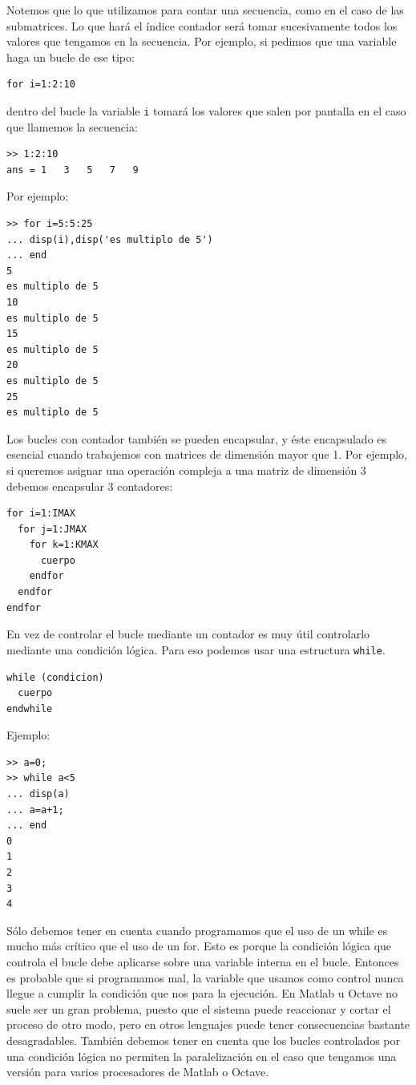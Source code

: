 Notemos que lo que utilizamos para contar una secuencia, como en el
caso de las submatrices. Lo que hará el índice contador será tomar
sucesivamente todos los valores que tengamos en la secuencia. Por
ejemplo, si pedimos que una variable haga un bucle de ese tipo:

\begin{lstlisting}
for i=1:2:10
\end{lstlisting}
dentro del bucle la variable \texttt{i} tomará los valores que salen
por pantalla en el caso que llamemos la secuencia:

\begin{lstlisting}
>> 1:2:10
ans = 1   3   5   7   9
\end{lstlisting}

Por ejemplo:
\begin{lstlisting}
>> for i=5:5:25
... disp(i),disp('es multiplo de 5')
... end
5
es multiplo de 5
10
es multiplo de 5
15
es multiplo de 5
20
es multiplo de 5
25
es multiplo de 5
\end{lstlisting}


Los bucles con contador también se pueden encapsular, y éste
encapsulado es esencial cuando trabajemos con matrices de dimensión
mayor que 1. Por ejemplo, si queremos asignar una operación compleja a
una matriz de dimensión  3 debemos encapsular 3 contadores:

\begin{lstlisting}
for i=1:IMAX   
  for j=1:JMAX   
    for k=1:KMAX   
      cuerpo   
    endfor   
  endfor   
endfor
\end{lstlisting}



En vez de controlar el bucle mediante un contador es muy útil
controlarlo mediante una condición lógica. Para eso podemos usar una
estructura \texttt{while}.

\begin{lstlisting}
while (condicion)   
  cuerpo   
endwhile
\end{lstlisting}

Ejemplo:
\begin{lstlisting}
>> a=0;
>> while a<5
... disp(a)
... a=a+1;
... end
0
1
2
3
4
\end{lstlisting}

Sólo debemos tener en cuenta cuando programamos que el uso de un while
es mucho más crítico que el uso de un for. Esto es porque la condición
lógica que controla el bucle debe aplicarse sobre una variable interna
en el bucle. Entonces es probable que si programamos mal, la variable
que usamos como control nunca llegue a cumplir la condición que nos
para la ejecución. En Matlab u Octave no suele ser un gran problema,
puesto que el sistema puede reaccionar y cortar el proceso de otro
modo, pero en otros lenguajes puede tener consecuencias bastante
desagradables.  También debemos tener en cuenta que los bucles
controlados por una condición lógica no permiten la paralelización en
el caso que tengamos una versión para varios procesadores de Matlab o
Octave.


